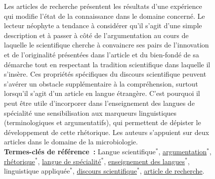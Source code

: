 \begin{figure}
\begin{minipage}{\linewidth}
{{          \vspace{-0.5em}
          Les articles de recherche présentent les résultats d'une expérience
          qui modifie l'état de la connaissance dans le domaine concerné. Le
          lecteur néophyte a tendance à considérer qu'il s'agit d'une simple
          description et à passer à côté de l'argumentation au cours de laquelle
          le scientifique cherche à convaincre ses pairs de l'innovation et de
          l'originalité présentées dans l'article et du bien-fondé de sa
          démarche tout en respectant la tradition scientifique dans laquelle il
          s'insère. Ces propriétés spécifiques du discours scientifique peuvent
          s'avérer un obstacle supplémentaire à la compréhension, surtout
          lorsqu'il s'agit d'un article en langue étrangère. C'est pourquoi il
          peut être utile d'incorporer dans l'enseignement des langues de
          spécialité une sensibilisation aux marqueurs linguistiques
          (terminologiques et argumentatifs), qui permettent de dépister le
          développement de cette rhétorique. Les auteurs s'appuient sur deux
          articles dans le domaine de la microbiologie.\\

          \vspace{-0.5em}
          \textbf{Termes-clés de référence~:} Langue scientifique$^*$,
          \underline{argumentation$^*$},  \underline{rhétorique$^*$}, 
          \underline{langue de spécialité$^*$}, \underline{enseignement des
          langues$^*$}, linguistique appliquée$^*$,  \underline{discours
          scientifique$^*$},  \underline{article de recherche}.
        }
      }
      ~\\~\\
\end{minipage}
\end{figure}
